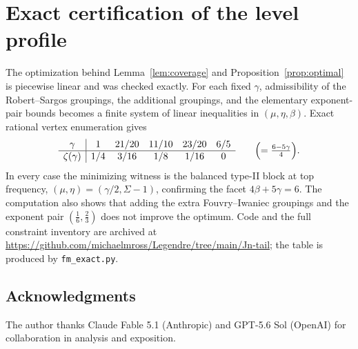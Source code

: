 \documentclass[11pt]{article}
\theoremstyle{remark}
\begin{document}
\appendix

\section{Exact certification of the level profile}\label{app:cert}

The optimization behind Lemma~\ref{lem:coverage} and Proposition~\ref{prop:optimal} is piecewise linear and was checked exactly. For each fixed $\gamma$, admissibility of the Robert--Sargos groupings, the additional \cite[Thm.~6]{FI} groupings, and the elementary exponent-pair bounds becomes a finite system of linear inequalities in $(\mu,\eta,\beta)$. Exact rational vertex enumeration gives
\[
\begin{array}{c|ccccc}
\gamma & 1 & 21/20 & 11/10 & 23/20 & 6/5\\ \hline
\zeta(\gamma) & 1/4 & 3/16 & 1/8 & 1/16 & 0
\end{array}
\qquad\Bigl(=\tfrac{6-5\gamma}{4}\Bigr).
\]
In every case the minimizing witness is the balanced type-II block at top frequency, $(\mu,\eta)=(\gamma/2,\Sigma-1)$, confirming the facet $4\beta+5\gamma=6$. The computation also shows that adding the extra Fouvry--Iwaniec groupings and the exponent pair $(\tfrac16,\tfrac23)$ does not improve the optimum. Code and the full constraint inventory are archived at
\url{https://github.com/michaelmross/Legendre/tree/main/Jn-tail}; the table is produced by \texttt{fm\_exact.py}.

\subsection*{Acknowledgments}
The author thanks Claude Fable 5.1 (Anthropic) and GPT-5.6 Sol (OpenAI) for collaboration in analysis and exposition.
\end{document}
